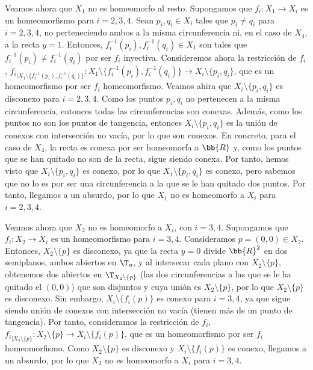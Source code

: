 \begin{ejercicio}
    Veamos ahora que $X_1$ no es homeomorfo al resto. Supongamos que $f_i:X_1\to X_i$ es un homeomorfismo para $i=2,3,4$.
    Sean $p_i,q_i\in X_i$ tales que $p_i\neq q_i$ para $i=2,3,4$, no perteneciendo ambos a la misma circunferencia ni, en el caso de $X_4$, a la recta $y=1$.
    Entonces, $f_i^{-1}(p_i),f_i^{-1}(q_i)\in X_1$ son tales que $f_i^{-1}(p_i)\neq f_i^{-1}(q_i)$ por ser $f_i$ inyectiva.
    Consideremos ahora la restricción de $f_i$, ${f_i}_{\big| X_1\setminus \{f_i^{-1}(p_i), f_i^{-1}(q_i)\}}: X_1\setminus \{f_i^{-1}(p_i), f_i^{-1}(q_i)\} \to X_i\setminus \{p_i,q_i\}$,
    que es un homeomorfismo por ser $f_i$ homeomorfismo. Veamos ahira que $X_i\setminus \{p_i,q_i\}$ es disconexo para $i=2,3,4$.
    Como los puntos $p_i,q_i$ no pertenecen a la misma circunferencia, entonces todas las circunferencias son conexas. Además, como
    los puntos no son los puntos de tangencia, entonces $X_i\setminus \{p_i,q_i\}$ es la unión de conexos con intersección no vacía, por lo que son conexos.
    En concreto, para el caso de $X_4$, la recta es conexa por ser homeomorfa a $\bb{R}$ y, como los puntos que se han quitado no son de la recta, sigue siendo conexa.
    Por tanto, hemos visto que $X_i\setminus \{p_i,q_i\}$ es conexo, por lo que $X_1\setminus \{p_i,q_i\}$ es conexo, pero sabemos que no lo es por ser una circunferencia a la que se le han quitado dos puntos.
    Por tanto, llegamos a un absurdo, por lo que $X_1$ no es homeomorfo a $X_i$ para $i=2,3,4$.

    Veamos ahora que $X_2$ no es homeomorfo a $X_i$, con $i=3,4$. Supongamos que $f_i:X_2\to X_i$ es un homeomorfismo para $i=3,4$.
    Consideramos $p=(0,0)\in X_2$. Entonces, $X_2\setminus \{p\}$ es disconexo, ya que la recta $y=0$ divide $\bb{R}^2$ en dos semiplanos, ambos abiertos en $\T_u$,
    y al intersecar cada plano con $X_2\setminus \{p\}$, obtenemos dos abiertos en $\T_{X_2\setminus \{p\}}$ (las dos circunferencias a las que se le ha quitado el $(0,0)$)
    que son disjuntos y cuya unión es $X_2\setminus \{p\}$, por lo que $X_2\setminus \{p\}$ es disconexo. Sin embargo, $X_i\setminus \{f_i(p)\}$ es conexo para $i=3,4$,
    ya que sigue siendo unión de conexos con intersección no vacía (tienen más de un punto de tangencia).
    Por tanto, consideramos la restricción de $f_i$, ${f_i}_{\big| X_2\setminus \{p\}}: X_2\setminus \{p\} \to X_i\setminus \{f_i(p)\}$, que es un homeomorfismo por ser $f_i$ homeomorfismo.
    Como $X_2\setminus \{p\}$ es disconexo y $X_i\setminus \{f_i(p)\}$ es conexo, llegamos a un absurdo, por lo que $X_2$ no es homeomorfo a $X_i$ para $i=3,4$.


\end{ejercicio}
